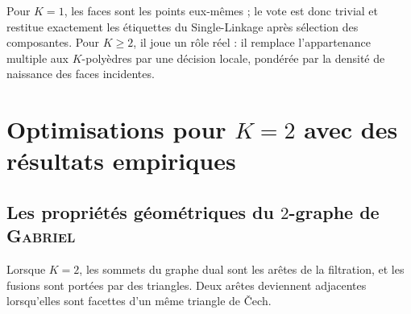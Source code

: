 Pour $K=1$, les faces sont les points eux-mêmes ; le vote est donc trivial et restitue exactement les étiquettes du Single-Linkage après sélection des composantes. Pour $K\ge2$, il joue un rôle réel : il remplace l'appartenance multiple aux $K$-polyèdres par une décision locale, pondérée par la densité de naissance des faces incidentes.

\section{Optimisations pour $K=2$ avec des résultats empiriques}
\label{sec:chapV_k2_empirique}

\subsection{Les propriétés géométriques du $2$-graphe de \textsc{Gabriel}}
\label{subsec:chapV_k2_algorithme}

Lorsque $K=2$, les sommets du graphe dual sont les arêtes de la filtration, et les fusions sont portées par des triangles. Deux arêtes deviennent adjacentes lorsqu'elles sont facettes d'un même triangle de \v Cech. %


